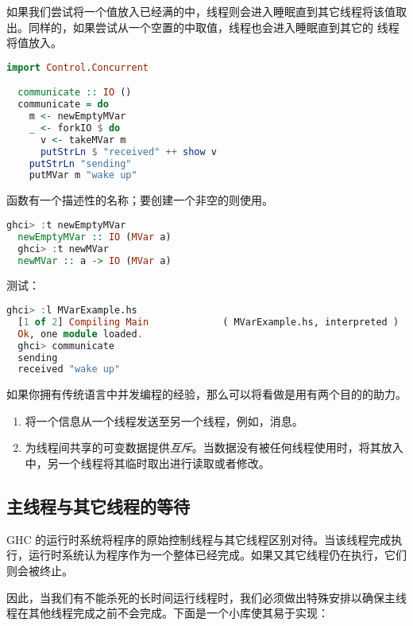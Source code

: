\documentclass[./main.tex]{subfiles}
\begin{document}
如果我们尝试将一个值放入已经满的中，线程则会进入睡眠直到其它线程将该值取出。同样的，如果尝试从一个空置的中取值，线程也会进入睡眠直到其它的
线程将值放入。

\begin{lstlisting}[language=Haskell]
  import Control.Concurrent

  communicate :: IO ()
  communicate = do
    m <- newEmptyMVar
    _ <- forkIO $ do
      v <- takeMVar m
      putStrLn $ "received" ++ show v
    putStrLn "sending"
    putMVar m "wake up"
\end{lstlisting}

函数有一个描述性的名称；要创建一个非空的则使用。

\begin{lstlisting}[language=Haskell]
  ghci> :t newEmptyMVar
  newEmptyMVar :: IO (MVar a)
  ghci> :t newMVar
  newMVar :: a -> IO (MVar a)
\end{lstlisting}

测试：

\begin{lstlisting}[language=Haskell]
  ghci> :l MVarExample.hs
  [1 of 2] Compiling Main             ( MVarExample.hs, interpreted )
  Ok, one module loaded.
  ghci> communicate
  sending
  received "wake up"
\end{lstlisting}

如果你拥有传统语言中并发编程的经验，那么可以将看做是用有两个目的的助力。

\begin{enumerate}
  \item 将一个信息从一个线程发送至另一个线程，例如，消息。
  \item 为线程间共享的可变数据提供\textit{互斥}。当数据没有被任何线程使用时，将其放入中，另一个线程将其临时取出进行读取或者修改。
\end{enumerate}

\subsection*{主线程与其它线程的等待}

GHC 的运行时系统将程序的原始控制线程与其它线程区别对待。当该线程完成执行，运行时系统认为程序作为一个整体已经完成。如果又其它线程仍在执行，它们则会被终止。

因此，当我们有不能杀死的长时间运行线程时，我们必须做出特殊安排以确保主线程在其他线程完成之前不会完成。下面是一个小库使其易于实现：
\end{document}
